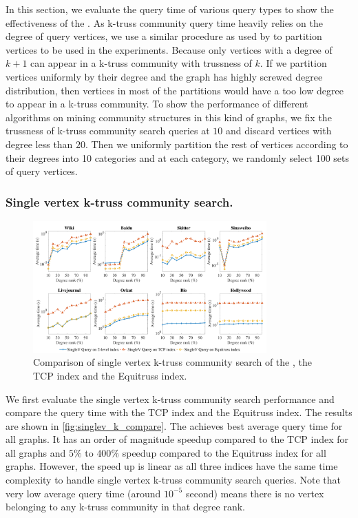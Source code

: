 In this section, we evaluate the query time of various query types to show the effectiveness of the \twolevelindex{}. As k-truss community query time heavily relies on the degree of query vertices, we use a similar procedure as used by \cite{huang2014querying} to partition vertices to be used in the experiments. Because only vertices with a degree of $k + 1$ can appear in a k-truss community with trussness of $k$. If we partition vertices uniformly by their degree and the graph has highly screwed degree distribution, then vertices in most of the partitions would have a too low degree to appear in a k-truss community. To show the performance of different algorithms on mining community structures in this kind of graphs, we fix the trussness of k-truss community search queries at $10$ and discard vertices with degree less than $20$. Then we uniformly partition the rest of vertices according to their degrees into 10 categories and at each category, we randomly select 100 sets of query vertices.

\subsubsection{Single vertex k-truss community search.}
\label{eval_singlev_k_compare}

\begin{figure}[t]
    \centering
    \includegraphics[width=0.8\textwidth]{./figures/singlev_k_compare.pdf}
    \caption{Comparison of single vertex k-truss community search of the \twolevelindex{}, the TCP index and the Equitruss index.}
    \label{fig:singlev_k_compare}
\end{figure}

We first evaluate the single vertex k-truss community search performance and compare the query time with the TCP index and the Equitruss index. The results are shown in \autoref{fig:singlev_k_compare}. The \twolevelindex{} achieves best average query time for all graphs. It has an order of magnitude speedup compared to the TCP index for all graphs and $5\%$ to $400\%$ speedup compared to the Equitruss index for all graphs. However, the speed up is linear as all three indices have the same time complexity to handle single vertex k-truss community search queries. Note that very low average query time (around $10^{-5}$ second) means there is no vertex belonging to any k-truss community in that degree rank.

